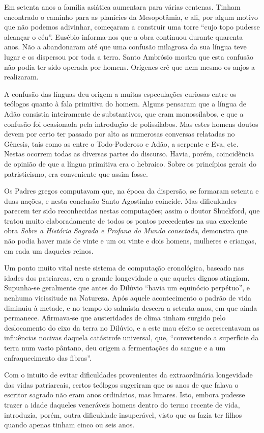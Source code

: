 \documentclass[11pt,a5paper,twoside,openany]{book}
\begin{document}
Em setenta anos a família asiática aumentara para várias centenas. Tinham encontrado o caminho para as planícies da Mesopotâmia, e ali, por algum motivo que não podemos adivinhar, começaram a construir uma torre “cujo topo pudesse alcançar o céu”. Eusébio informa-nos que a obra continuou durante quarenta anos. Não a abandonaram até que uma confusão milagrosa da sua língua teve lugar e os dispersou por toda a terra. Santo Ambrósio mostra que esta confusão não podia ter sido operada por homens. Orígenes crê que nem mesmo os anjos a realizaram.

A confusão das línguas deu origem a muitas especulações curiosas entre os teólogos quanto à fala primitiva do homem. Alguns pensaram que a língua de Adão consistia inteiramente de substantivos, que eram monossílabos, e que a confusão foi ocasionada pela introdução de polissílabos. Mas estes homens doutos devem por certo ter passado por alto as numerosas conversas relatadas no Gênesis, tais como as entre o Todo-Poderoso e Adão, a serpente e Eva, etc. Nestas ocorrem todas as diversas partes do discurso. Havia, porém, coincidência de opinião de que a língua primitiva era o hebraico. Sobre os princípios gerais do patristicismo, era conveniente que assim fosse.

Os Padres gregos computavam que, na época da dispersão, se formaram setenta e duas nações, e nesta conclusão Santo Agostinho coincide. Mas dificuldades parecem ter sido reconhecidas nestas computações; assim o doutor Shuckford, que tratou muito elaboradamente de todos os pontos precedentes na sua excelente obra \textit{Sobre a História Sagrada e Profana do Mundo conectada}, demonstra que não podia haver mais de vinte e um ou vinte e dois homens, mulheres e crianças, em cada um daqueles reinos.

Um ponto muito vital neste sistema de computação cronológica, baseado nas idades dos patriarcas, era a grande longevidade a que aqueles dignos atingiam. Supunha-se geralmente que antes do Dilúvio “havia um equinócio perpétuo”, e nenhuma vicissitude na Natureza. Após aquele acontecimento o padrão de vida diminuiu à metade, e no tempo do salmista descera a setenta anos, em que ainda permanece. Afirmava-se que austeridades de clima tinham surgido pelo deslocamento do eixo da terra no Dilúvio, e a este mau efeito se acrescentavam as influências nocivas daquela catástrofe universal, que, “convertendo a superfície da terra num vasto pântano, deu origem a fermentações do sangue e a um enfraquecimento das fibras”.

Com o intuito de evitar dificuldades provenientes da extraordinária longevidade das vidas patriarcais, certos teólogos sugeriram que os anos de que falava o escritor sagrado não eram anos ordinários, mas lunares. Isto, embora pudesse trazer a idade daqueles veneráveis homens dentro do termo recente de vida, introduzia, porém, outra dificuldade insuperável, visto que os fazia ter filhos quando apenas tinham cinco ou seis anos.
\end{document}
